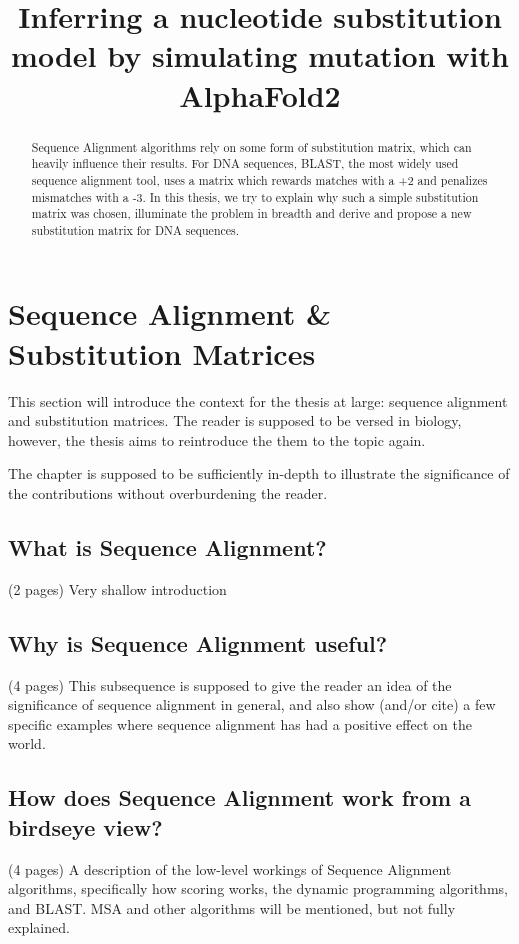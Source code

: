\documentclass{article}
\title{Inferring a nucleotide substitution model by simulating mutation with AlphaFold2}
\begin{document}
\maketitle
\begin{abstract}
    Sequence Alignment algorithms rely on some form of substitution matrix, which
    can heavily influence their results. For DNA sequences, BLAST, the most widely used sequence alignment tool,
    uses a matrix which rewards matches with a +2 and penalizes mismatches with a -3. In this thesis,
    we try to explain why such a simple substitution matrix was chosen, illuminate the problem in breadth
    and derive and propose a new substitution matrix for DNA sequences.
    \tableofcontents

\end{abstract}
\section{Sequence Alignment \& Substitution Matrices}
This section will introduce the context for the thesis at large: sequence alignment
and substitution matrices. The reader is supposed to be versed in biology, however,
the thesis aims to reintroduce the them to the topic again.

The chapter is supposed to be sufficiently in-depth to illustrate the significance of the
contributions without overburdening the reader.

%
%
%
\subsection{What is Sequence Alignment?}
(2 pages)
Very shallow introduction
%
%
\subsection{Why is Sequence Alignment useful?}
(4 pages)
This subsequence is supposed to give the reader an idea of the significance of sequence alignment
in general, and also show (and/or cite) a few specific examples where sequence alignment
has had a positive effect on the world.

%
%
%
\subsection{How does Sequence Alignment work from a birdseye view?}
(4 pages)
A description of the low-level workings of Sequence Alignment algorithms, specifically
how scoring works, the dynamic programming algorithms, and BLAST. MSA and other algorithms will
be mentioned, but not fully explained.
%
%
%
\end{document}

